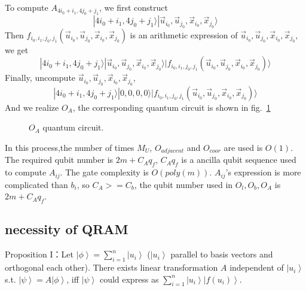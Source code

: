 \documentclass[%
 reprint,
 amsmath,amssymb,
pra,
]{revtex4-1}
\begin{document}
To compute $A_{4i_0+i_1,4j_0+j_1}$, we first construct
$$
|4i_0+i_1,4j_0+j_1\rangle|\vec{u}_{i_0},\vec{u}_{j_0},\vec{x}_{i_0},\vec{x}_{j_0}\rangle
$$
Then $f_{i_0,i_1,j_0,j_1}(\vec{u}_{i_0},\vec{u}_{j_0},\vec{x}_{i_0},\vec{x}_{j_0})$  is an arithmetic expression of $\vec{u}_{i_0},\vec{u}_{j_0},\vec{x}_{i_0},\vec{x}_{j_0}$, we get
$$
|4i_0+i_1,4j_0+j_1\rangle|\vec{u}_{i_0},\vec{u}_{j_0},\vec{x}_{i_0},\vec{x}_{j_0}\rangle|f_{i_0,i_1,j_0,j_1}(\vec{u}_{i_0},\vec{u}_{j_0},\vec{x}_{i_0},\vec{x}_{j_0})\rangle
$$
Finally, uncompute $\vec{u}_{i_0},\vec{u}_{j_0},\vec{x}_{i_0},\vec{x}_{j_0}$,
$$
|4i_0+i_1,4j_0+j_1\rangle|0,0,0,0\rangle|f_{i_0,i_1,j_0,j_1}(\vec{u}_{i_0},\vec{u}_{j_0},\vec{x}_{i_0},\vec{x}_{j_0})\rangle
$$
And we realize $O_A$, the corresponding quantum circuit is shown in fig.~\ref{OA} 
\begin{figure}[htbp]
    \caption{$O_A$ quantum circuit. }
    \label{OA}
\end{figure}
In this process,the number of times $M_U$, $O_{adjacent}$ and $O_{coor}$ are used is $O(1)$. The required qubit number is $2m+C_Aq_f$, $C_Aq_f$ is a ancilla qubit sequence used to compute $A_{ij}$. The gate complexity is $O(poly(m))$. $A_{ij}$'s expression is more complicated than $b_i$, so $C_A>=C_b$, the qubit number used in $O_l,O_b,O_A$ is $2m+C_Aq_f$.

\subsection{necessity of QRAM}
\noindent Proposition I：Let $\left|\phi\right\rangle = \sum_{i=1}^n \left|u_i\right\rangle$ ($\left|u_i\right\rangle$ parallel to basis vectors and orthogonal each other). There exists 
linear transformation $A$ independent of $\left|u_{i}\right\rangle$ s.t. $\left|\psi\right\rangle = A\left|\phi\right\rangle$, iff $\left|\psi\right\rangle$ could express as $\sum_{i=1}^{n}\left|u_i\right\rangle\left|f\left(u_i\right)\right\rangle$.
\end{document}
